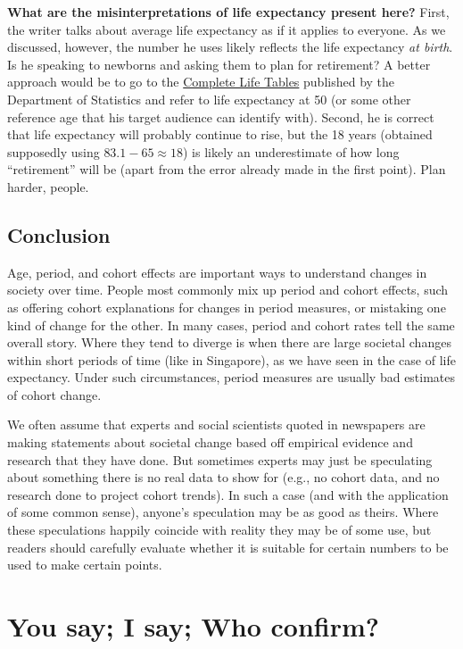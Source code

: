 \documentclass[
  openany]{book}
\begin{document}
\textbf{What are the misinterpretations of life expectancy present here?} First, the writer talks about average life expectancy as if it applies to everyone. As we discussed, however, the number he uses likely reflects the life expectancy \emph{at birth}. Is he speaking to newborns and asking them to plan for retirement? A better approach would be to go to the \href{https://www.singstat.gov.sg/-/media/files/publications/population/lifetable17-18.pdf}{Complete Life Tables} published by the Department of Statistics and refer to life expectancy at 50 (or some other reference age that his target audience can identify with). Second, he is correct that life expectancy will probably continue to rise, but the 18 years (obtained supposedly using \(83.1 - 65 \approx 18\)) is likely an underestimate of how long ``retirement'' will be (apart from the error already made in the first point). Plan harder, people.

\hypertarget{conclusion-3}{%
\section{Conclusion}\label{conclusion-3}}

Age, period, and cohort effects are important ways to understand changes in society over time. People most commonly mix up period and cohort effects, such as offering cohort explanations for changes in period measures, or mistaking one kind of change for the other. In many cases, period and cohort rates tell the same overall story. Where they tend to diverge is when there are large societal changes within short periods of time (like in Singapore), as we have seen in the case of life expectancy. Under such circumstances, period measures are usually bad estimates of cohort change.

We often assume that experts and social scientists quoted in newspapers are making statements about societal change based off empirical evidence and research that they have done. But sometimes experts may just be speculating about something there is no real data to show for (e.g., no cohort data, and no research done to project cohort trends). In such a case (and with the application of some common sense), anyone's speculation may be as good as theirs. Where these speculations happily coincide with reality they may be of some use, but readers should carefully evaluate whether it is suitable for certain numbers to be used to make certain points.

\hypertarget{yousayisay}{%
\chapter{You say; I say; Who confirm?}\label{yousayisay}}
\end{document}
